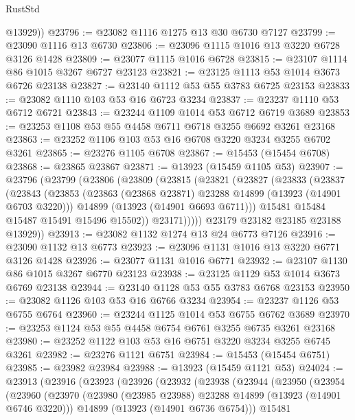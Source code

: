 \begin{lexlean}{RustStd}
\begin{coremodule}
        @13929))
@23796 := @23082 @1116 @1275 @13 @30 @6730 @7127
@23799 := @23090 @1116 @13 @6730
@23806 := @23096 @1115 @1016 @13 @3220 @6728 @3126 @1428
@23809 := @23077 @1115 @1016 @6728
@23815 := @23107 @1114 @86 @1015 @3267 @6727 @23123
@23821 := @23125 @1113 @53 @1014 @3673 @6726 @23138
@23827 := @23140 @1112 @53 @55 @3783 @6725 @23153
@23833 := @23082 @1110 @103 @53 @16 @6723 @3234
@23837 := @23237 @1110 @53 @6712 @6721
@23843 := @23244 @1109 @1014 @53 @6712 @6719 @3689
@23853 := @23253 @1108 @53 @55 @4458 @6711 @6718 @3255 @6692 @3261 @23168
@23863 := @23252 @1106 @103 @53 @16 @6708 @3220 @3234 @3255 @6702 @3261
@23865 := @23276 @1105 @6708
@23867 := @15453 (@15454 @6708)
@23868 := @23865 @23867
@23871 := @13923 (@15459 @1105 @53)
@23907 := @23796
    (@23799
      (@23806
        (@23809
          (@23815
            (@23821
              (@23827
                (@23833
                  (@23837
                    (@23843
                      (@23853
                        (@23863 (@23868 @23871) @23288 @14899 (@13923 (@14901 @6703 @3220)))
                        @14899
                        (@13923 (@14901 @6693 @6711)))
                      @15481
                      @15484
                      @15487
                      @15491
                      @15496
                      @15502))
                  @23171)))))
        @23179
        @23182
        @23185
        @23188
        @13929))
@23913 := @23082 @1132 @1274 @13 @24 @6773 @7126
@23916 := @23090 @1132 @13 @6773
@23923 := @23096 @1131 @1016 @13 @3220 @6771 @3126 @1428
@23926 := @23077 @1131 @1016 @6771
@23932 := @23107 @1130 @86 @1015 @3267 @6770 @23123
@23938 := @23125 @1129 @53 @1014 @3673 @6769 @23138
@23944 := @23140 @1128 @53 @55 @3783 @6768 @23153
@23950 := @23082 @1126 @103 @53 @16 @6766 @3234
@23954 := @23237 @1126 @53 @6755 @6764
@23960 := @23244 @1125 @1014 @53 @6755 @6762 @3689
@23970 := @23253 @1124 @53 @55 @4458 @6754 @6761 @3255 @6735 @3261 @23168
@23980 := @23252 @1122 @103 @53 @16 @6751 @3220 @3234 @3255 @6745 @3261
@23982 := @23276 @1121 @6751
@23984 := @15453 (@15454 @6751)
@23985 := @23982 @23984
@23988 := @13923 (@15459 @1121 @53)
@24024 := @23913
    (@23916
      (@23923
        (@23926
          (@23932
            (@23938
              (@23944
                (@23950
                  (@23954
                    (@23960
                      (@23970
                        (@23980 (@23985 @23988) @23288 @14899 (@13923 (@14901 @6746 @3220)))
                        @14899
                        (@13923 (@14901 @6736 @6754)))
                      @15481

\end{coremodule}
\end{lexlean}
